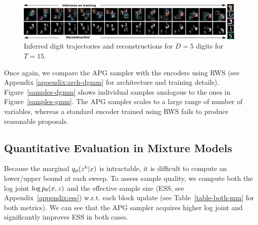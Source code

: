 \documentclass[anonymous=false, %
               format=acmsmall, %
               review=true, %
               screen=true, %
               nonacm=true]{acmart}
\theoremstyle{definition}
\begin{document}
\begin{figure}[!t]
  \centering
  \includegraphics[width=1.0\textwidth]{figures/bmnist-5digits-samples.pdf}
  \vspace{-2.0em}
  \caption{Inferred digit trajectories and reconstructions for $D = 5$ digits for $T = 15$.}
  \label{mnist-qualitative}
\end{figure}
Once again, we compare the APG sampler with the encoders using RWS (see Appendix \ref{appendix:arch-dgmm} for architecture and training details). Figure~\ref{samples-dgmm} shows individual samples analogous to the ones in Figure~\ref{samples-gmm}. The APG sampler scales to a large range of number of variables, whereas a standard encoder trained using RWS fails to produce reasonable proposals.
\subsection{Quantitative Evaluation in Mixture Models}
Because the marginal $q_\phi(z^k | x)$ is intractable, it is difficult to compute an lower/upper bound at each sweep. To assess sample quality, we compute both the log joint $\log p_\theta(x, z)$ and the effective sample size (ESS, see Appendix~\ref{appendix:ess}) w.r.t. each block update (see Table~\ref{table-both-mm} for both metrics). We can see that the APG sampler acquires higher log joint and significantly improves ESS in both cases.
\end{document}
